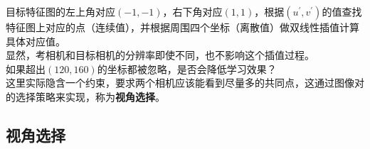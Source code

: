 		目标特征图的左上角对应$(-1,-1)$，右下角对应$(1,1)$，根据$(u^\prime, v^\prime)$的值查找特征图上对应的点（连续值），并根据周围四个坐标（离散值）做双线性插值计算具体对应值。\\

		显然，考相机和目标相机的分辨率即使不同，也不影响这个插值过程。\\

		如果超出$(120,160)$的坐标都被忽略，是否会降低学习效果？\\

		这里实际隐含一个约束，要求两个相机应该能看到尽量多的共同点，这通过图像对的选择策略来实现，称为\textbf{视角选择}。

\subsection{视角选择}
	
